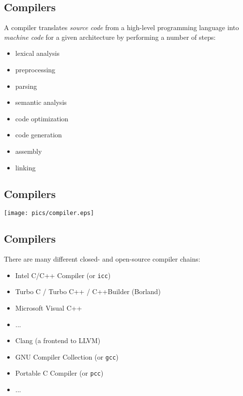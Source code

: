 \documentclass[xga]{xdvislides}
\begin{document}
\subsection{Compilers}

A compiler translates {\em source code} from a high-level programming
language into {\em machine code} for a given architecture by performing a
number of steps:

\begin{itemize}
	\item lexical analysis
	\item preprocessing
	\item parsing
	\item semantic analysis
	\item code optimization
	\item code generation
	\item assembly
	\item linking
\end{itemize}

\subsection{Compilers}

\begin{center}
	\texttt{[image: pics/compiler.eps]}
\end{center}


\subsection{Compilers}

There are many different closed- and open-source compiler chains:

\begin{itemize}
	\item Intel C/C++ Compiler (or \verb+icc+)
	\item Turbo C / Turbo C++ / C++Builder (Borland)
	\item Microsoft Visual C++
	\item ...
\\

	\item Clang (a frontend to LLVM)
	\item GNU Compiler Collection (or \verb+gcc+)
	\item Portable C Compiler (or \verb+pcc+)
	\item ...
\end{itemize}
\end{document}
